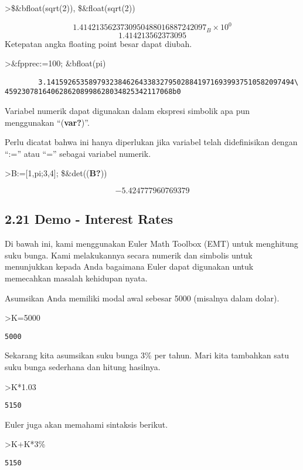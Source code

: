 \documentclass[
]{book}
\begin{document}
\textgreater\$\&bfloat(sqrt(2)), \$\&float(sqrt(2))

\[1.4142135623730950488016887242097_B \times 10^{0}\] \[1.414213562373095\] Ketepatan angka floating point besar dapat diubah.

\textgreater\&fpprec:=100; \&bfloat(pi)

\begin{verbatim}
        3.14159265358979323846264338327950288419716939937510582097494\
4592307816406286208998628034825342117068b0
\end{verbatim}

Variabel numerik dapat digunakan dalam ekspresi simbolik apa pun menggunakan ``(\textbf{var?})''.

Perlu dicatat bahwa ini hanya diperlukan jika variabel telah didefinisikan dengan ``:='' atau ``='' sebagai variabel numerik.

\textgreater B:={[}1,pi;3,4{]}; \$\&det((\textbf{B?}))

\[-5.424777960769379\] 

\subsection{2.21 Demo - Interest Rates}

Di bawah ini, kami menggunakan Euler Math Toolbox (EMT) untuk menghitung suku bunga. Kami melakukannya secara numerik dan simbolis untuk menunjukkan kepada Anda bagaimana Euler dapat digunakan untuk memecahkan masalah kehidupan nyata.

Asumsikan Anda memiliki modal awal sebesar 5000 (misalnya dalam dolar).

\textgreater K=5000

\begin{verbatim}
5000
\end{verbatim}

Sekarang kita asumsikan suku bunga 3\% per tahun. Mari kita tambahkan satu suku bunga sederhana dan hitung hasilnya.

\textgreater K*1.03

\begin{verbatim}
5150
\end{verbatim}

Euler juga akan memahami sintaksis berikut.

\textgreater K+K*3\%

\begin{verbatim}
5150
\end{verbatim}
\end{document}
